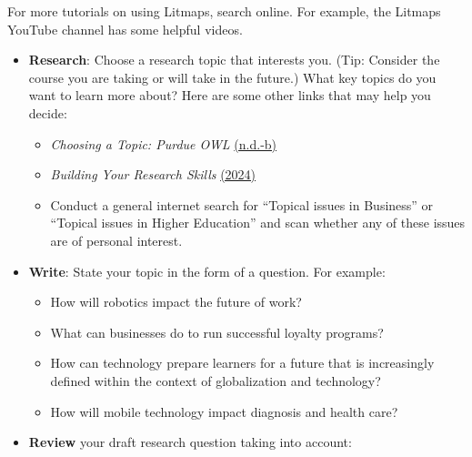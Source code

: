 \documentclass[
  letterpaper,
  DIV=11,
  numbers=noendperiod]{scrreprt}
\providecommand{\tightlist}{%
  \setlength{\itemsep}{0pt}\setlength{\parskip}{0pt}}\usepackage{longtable,booktabs,array}
\begin{document}
For more tutorials on using Litmaps, search online. For example, the
Litmaps YouTube channel has some helpful videos.

\begin{tcolorbox}[enhanced jigsaw, toprule=.15mm, colback=white, colframe=quarto-callout-note-color-frame, bottomtitle=1mm, leftrule=.75mm, coltitle=black, titlerule=0mm, rightrule=.15mm, colbacktitle=quarto-callout-note-color!10!white, left=2mm, title={Learning Activity}, opacitybacktitle=0.6, opacityback=0, breakable, toptitle=1mm, arc=.35mm, bottomrule=.15mm]

\begin{itemize}
\tightlist
\item
  \textbf{Research}: Choose a research topic that interests you. (Tip:
  Consider the course you are taking or will take in the future.) What
  key topics do you want to learn more about? Here are some other links
  that may help you decide:

  \begin{itemize}
  \tightlist
  \item
    \emph{Choosing a Topic: Purdue OWL}
    \href{https://owl.purdue.edu/owl/general_writing/common_writing_assignments/research_papers/choosing_a_topic.html}{(n.d.-b)}
  \item
    \emph{Building Your Research Skills}
    \href{https://libguides.twu.ca/ResearchSkills/Home}{(2024)}
  \item
    Conduct a general internet search for ``Topical issues in Business''
    or ``Topical issues in Higher Education'' and scan whether any of
    these issues are of personal interest.
  \end{itemize}
\item
  \textbf{Write}: State your topic in the form of a question. For
  example:

  \begin{itemize}
  \tightlist
  \item
    How will robotics impact the future of work?
  \item
    What can businesses do to run successful loyalty programs?
  \item
    How can technology prepare learners for a future that is
    increasingly defined within the context of globalization and
    technology?
  \item
    How will mobile technology impact diagnosis and health care?
  \end{itemize}
\item
  \textbf{Review} your draft research question taking into account:


\end{itemize}
\end{tcolorbox}
\end{document}
